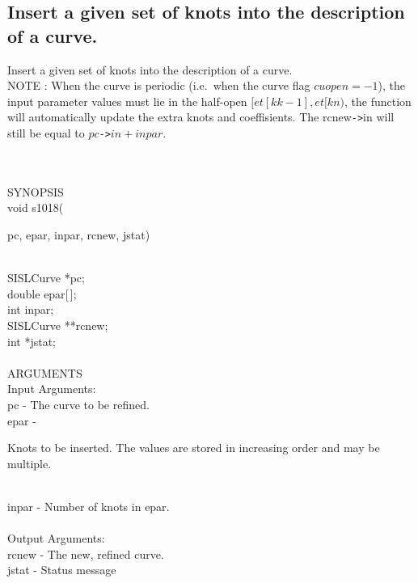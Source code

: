 \subsection{Insert a given set of knots into the description of a curve.}
\begin{minipg1}
  Insert a given set of knots into the description of a curve.\\
  NOTE       : When the curve is periodic (i.e.\ when the curve flag
  $cuopen=-1$), the input parameter values must lie in the half-open
  $[et[kk-1], et[kn)$, the function will automatically update the extra
  knots and coeffisients.
  The {\fov rcnew}{\tt ->}{\fov in} will still be equal to $pc${\tt ->}$in + inpar$.
\end{minipg1} \\ \\
SYNOPSIS\\
        \>void s1018(\begin{minipg3}
          {\fov pc},  {\fov epar},  {\fov inpar},  {\fov rcnew},  {\fov jstat})
        \end{minipg3}\\[0.3ex]
        \>\>    SISLCurve \> *{\fov pc};\\
        \>\>    double    \> {\fov epar}[\,];\\
        \>\>    int       \> {\fov inpar};\\
        \>\>    SISLCurve \> **{\fov rcnew};\\
        \>\>    int       \> *{\fov jstat};\\
\\
ARGUMENTS\\
        \>Input Arguments:\\
        \>\>    {\fov pc}   \> - \> The curve to be refined.\\
        \>\>    {\fov epar} \> - \>
        \begin{minipg2}
          Knots to be inserted. The values are stored in increasing
          order and may be multiple.
        \end{minipg2}\\[0.8ex]
        \>\>    {\fov inpar} \> - \> Number of knots in {\fov epar}.\\
\\
        \>Output Arguments:\\
        \>\>    {\fov rcnew} \> - \> The new, refined curve.\\
        \>\>    {\fov jstat} \> - \> Status message\\
